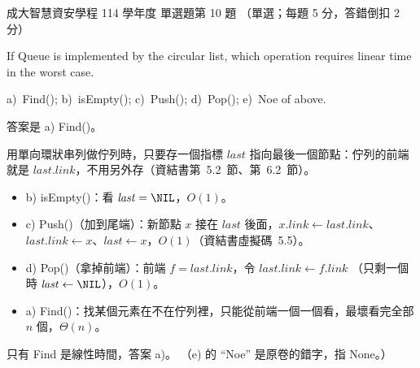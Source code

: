 \begin{pastexam}[label={px:ncku-114-isec-ds-10}]{成大智慧資安學程 114 學年度 單選題第 10 題}
（單選；每題 5 分，答錯倒扣 2 分）

If Queue is implemented by the circular list, which operation requires linear time in the worst case.

a)~Find(); \qquad b)~isEmpty(); \qquad c)~Push(); \qquad d)~Pop(); \qquad e)~Noe of above.
\end{pastexam}

\begin{pastsoln}
答案是 a) Find()。

用單向環狀串列做佇列時，只要存一個指標 $\mathit{last}$ 指向最後一個節點：佇列的前端就是
$\mathit{last}.\mathit{link}$，不用另外存（資結書第~5.2~節、第~6.2~節）。
\begin{itemize}
\item b) isEmpty()：看 $\mathit{last} = \NIL$，$O(1)$。
\item c) Push()（加到尾端）：新節點 $x$ 接在 $\mathit{last}$ 後面，$x.\mathit{link} \gets \mathit{last}.\mathit{link}$、
$\mathit{last}.\mathit{link} \gets x$、$\mathit{last} \gets x$，$O(1)$（資結書虛擬碼~5.5）。
\item d) Pop()（拿掉前端）：前端 $f = \mathit{last}.\mathit{link}$，令 $\mathit{last}.\mathit{link} \gets f.\mathit{link}$
（只剩一個時 $\mathit{last} \gets \NIL$），$O(1)$。
\item a) Find()：找某個元素在不在佇列裡，只能從前端一個一個看，最壞看完全部 $n$ 個，$\Theta(n)$。
\end{itemize}
只有 Find 是線性時間，答案 a)。 （e) 的 ``Noe'' 是原卷的錯字，指 None。）
\end{pastsoln}
